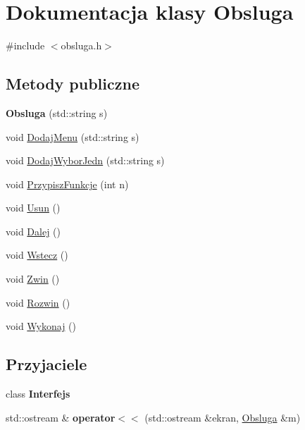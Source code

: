 \hypertarget{classObsluga}{\section{Dokumentacja klasy Obsluga}
\label{classObsluga}
}


{\ttfamily \#include $<$obsluga.\-h$>$}

\subsection*{Metody publiczne}
\begin{DoxyCompactItemize}
\item 
\hypertarget{classObsluga_a5d6c171d6a9b4f6f9caa444b09fcb460}{{\bfseries Obsluga} (std\-::string s)}\label{classObsluga_a5d6c171d6a9b4f6f9caa444b09fcb460}

\item 
void \hyperlink{classObsluga_aaf91f84ea408e2ee478009ff28d0719c}{Dodaj\-Menu} (std\-::string s)
\item 
void \hyperlink{classObsluga_a141f1c29476498fecf4c74983c60f107}{Dodaj\-Wybor\-Jedn} (std\-::string s)
\item 
void \hyperlink{classObsluga_a79ac7b11058423a625c971688d012a5c}{Przypisz\-Funkcje} (int n)
\item 
void \hyperlink{classObsluga_af4498067cfb12688c9b395a9ec58cd4a}{Usun} ()
\item 
void \hyperlink{classObsluga_a5567d2685b8ca89fe1d6593f0826a653}{Dalej} ()
\item 
void \hyperlink{classObsluga_a36f1c6f4841b40c6d44fd1fc3fd2449b}{Wstecz} ()
\item 
void \hyperlink{classObsluga_add7a400f68afe5e0c049855ed428fd3a}{Zwin} ()
\item 
void \hyperlink{classObsluga_a3b625d79bab85d07a4da24bc105e312d}{Rozwin} ()
\item 
void \hyperlink{classObsluga_aed45a6c9be358bcbce191617e6e04be7}{Wykonaj} ()
\end{DoxyCompactItemize}
\subsection*{Przyjaciele}
\begin{DoxyCompactItemize}
\item 
\hypertarget{classObsluga_a29bee9078fbc123e023d6d8cb376928d}{class {\bfseries Interfejs}}\label{classObsluga_a29bee9078fbc123e023d6d8cb376928d}

\item 
\hypertarget{classObsluga_aeac69cdc1820ab17cd012468f3f0a85c}{std\-::ostream \& {\bfseries operator$<$$<$} (std\-::ostream \&ekran, \hyperlink{classObsluga}{Obsluga} \&m)}\label{classObsluga_aeac69cdc1820ab17cd012468f3f0a85c}

\end{DoxyCompactItemize}


